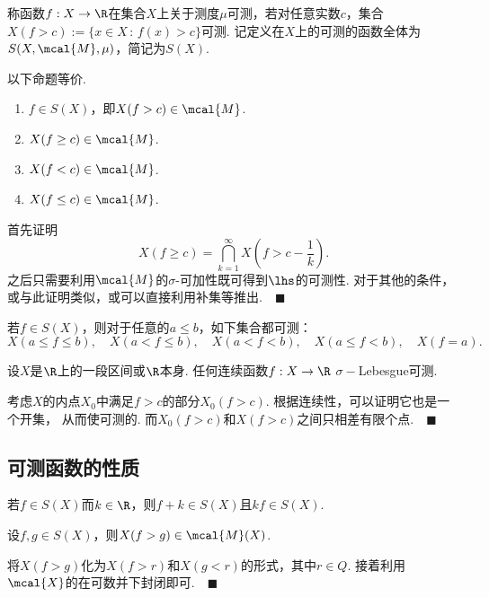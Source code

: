    \begin{defi}[可测]
     称函数$f:X\to\R$在集合$X$上关于测度$\mu$可测，若对任意实数$c$，集合$X(f>c):=\{x\in X
     \,:\,f(x)>c\}$可测. 记定义在$X$上的可测的函数全体为$S(X,\mcal{M}, \mu)$，简记为$S(X)$.
   \end{defi}

  \begin{lemma}
    以下命题等价.
    \begin{enumerate}
      \item $f\in S(X)$，即$X(f>c)\in\mcal{M}$.
      \item $X(f\ge c)\in\mcal{M}$.
      \item $X(f<c)\in\mcal{M}$.
      \item $X(f\le c)\in\mcal{M}$.
    \end{enumerate}
  \end{lemma}
  \proof
    首先证明
    \[
      X(f\ge c) = \bigcap_{k=1}^\infty X\left(f>c-\frac{1}{k}\right).
    \]
    之后只需要利用$\mcal{M}$的$\sigma$-可加性既可得到$\lhs$的可测性. 对于其他的条件，
    或与此证明类似，或可以直接利用补集等推出.$\quad\blacksquare$

  \begin{cor}
    若$f\in S(X)$，则对于任意的$a\le b$，如下集合都可测：
    \[
      X(a\le f\le b),\quad X(a<f\le b),\quad X(a<f<b),\quad X(a\le f<b), \quad 
      X(f=a).
    \]
  \end{cor}

  \begin{thm}
    设$X$是$\R$上的一段区间或$\R$本身. 任何连续函数$f:X\to\R$ $\sigma-$Lebesgue可测.
  \end{thm}
  \proof
    考虑$X$的内点$X_0$中满足$f>c$的部分$X_0(f>c)$. 根据连续性，可以证明它也是一个开集，
    从而使可测的. 而$X_0(f>c)$和$X(f>c)$之间只相差有限个点.$\quad\blacksquare$

\subsection{可测函数的性质}
  \begin{pos}
    若$f\in S(X)$而$k\in\R$，则$f+k\in S(X)$且$kf\in S(X)$.
  \end{pos}

  \begin{lemma}
    设$f,g\in S(X)$，则$X(f>g)\in\mcal{M}(X)$.
  \end{lemma}
  \proof
    将$X(f>g)$化为$X(f>r)$和$X(g<r)$的形式，其中$r\in Q$. 接着利用
    $\mcal{X}$的在可数并下封闭即可.$\quad\blacksquare$

